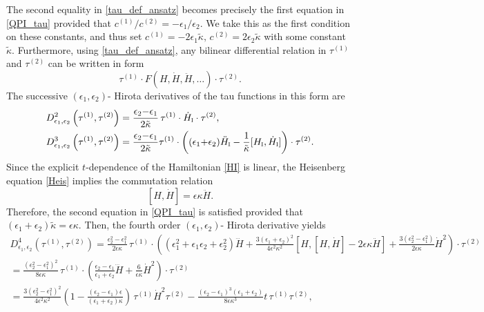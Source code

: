 \documentclass[12pt,a4paper]{article}
\numberwithin{equation}{section}
\newcommand{\I}{\scalebox{.6}{I}}
\begin{document}
The second equality in \eqref{tau_def_ansatz} becomes precisely the first equation in \eqref{QPI_tau} provided that $c^{(1)}/c^{(2)}=-\epsilon_1/\epsilon_2$. We take this as the first condition on these constants, and thus set $c^{(1)}=-2\epsilon_1\tilde{\kappa},\, c^{(2)}=2\epsilon_2\tilde{\kappa}$ with some constant $\tilde{\kappa}$. Furthermore, using \eqref{tau_def_ansatz}, any bilinear differential relation in $\tau^{(1)}$ and $\tau^{(2)}$ can be written in form
\begin{equation}
\tau^{(1)}\cdot F(H,\dot{H},\ddot{H},\ldots) \cdot\tau^{(2)}.    
\end{equation}
The successive $(\epsilon_1,\epsilon_2)$- Hirota derivatives of the tau functions in this form are 
\begin{align}
D^2_{\epsilon_1,\epsilon_2}\left(\tau^{(1)},\tau^{(2)}\right)&=\frac{\epsilon_2{-}\epsilon_1}{2\tilde{\kappa}}\,\tau^{(1)}\cdot \dot{H}_{\I}\cdot\tau^{(2)},\\ \label{D3_I}
D^3_{\epsilon_1,\epsilon_2}\left(\tau^{(1)},\tau^{(2)}\right)&=\frac{\epsilon_2{-}\epsilon_1}{2\tilde{\kappa}}\tau^{(1)}\cdot\left((\epsilon_1{+}\epsilon_2)\ddot{H}_{\I}-\frac1{\tilde{\kappa}}[H_{\I},\dot{H}_{\I}]\right)\cdot\tau^{(2)}.
\end{align}
Since the explicit $t$-dependence of the Hamiltonian \eqref{HI} is linear, the Heisenberg equation \eqref{Heis} implies the commutation relation
\begin{equation}\label{H_Hd_I}
[H,\dot{H}]=\epsilon\kappa \ddot{H}.  
\end{equation}
Therefore, the second equation in \eqref{QPI_tau} is satisfied provided that
$(\epsilon_1{+}\epsilon_2)\tilde{\kappa}=\epsilon\kappa$.
Then, the fourth order $(\epsilon_1,\epsilon_2)$- Hirota derivative yields
\begin{multline}\label{D4_I}
D^4_{\epsilon_1,\epsilon_2}\left(\tau^{(1)},\tau^{(2)}\right)=\frac{\epsilon_2^2{-}\epsilon_1^2}{2\epsilon\kappa}\,\tau^{(1)}\cdot\left((\epsilon_1^2{+}\epsilon_1\epsilon_2{+}\epsilon_2^2)\dddot{H}+\frac{3(\epsilon_1{+}\epsilon_2)^2}{4\epsilon^2\kappa^2}\left[H,[H,\dot{H}]-2\epsilon\kappa\ddot{H}\right]+\frac{3(\epsilon_2^2{-}\epsilon_1^2)}{2\epsilon\kappa}\dot{H}^2\right)\cdot\tau^{(2)}\\=\frac{(\epsilon_2^2{-}\epsilon_1^2)^2}{8\epsilon\kappa}\,\tau^{(1)}\cdot\left(\frac{\epsilon_2{-}\epsilon_1}{\epsilon_1{+}\epsilon_2}\dddot{H}+\frac{6}{\epsilon\kappa}\dot{H}^2\right)\cdot\tau^{(2)}\\=\frac{3(\epsilon_2^2{-}\epsilon_1^2)^2}{4\epsilon^2\kappa^2}\left(1-\frac{(\epsilon_2{-}\epsilon_1)\epsilon}{(\epsilon_1{+}\epsilon_2)\kappa}\right)\,\tau^{(1)}\dot{H}^2\tau^{(2)}-\frac{(\epsilon_2{-}\epsilon_1)^3(\epsilon_1{+}\epsilon_2)}{8\epsilon\kappa^3}t\,\tau^{(1)}\tau^{(2)},
\end{multline}
\end{document}
